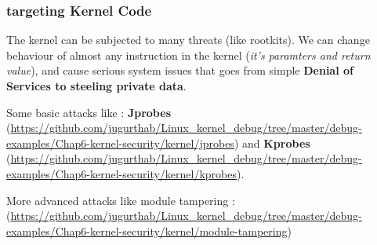 \begin{center}
\end{center}
\subsubsection{targeting Kernel Code}
The kernel can be subjected to many threats (like rootkits).
We can change behaviour of almost any instruction in the kernel (\textit{it's paramters and return value}), and cause
serious system issues that goes from simple \textbf{Denial of Services to steeling private data}.

Some basic attacks like : \textbf{Jprobes} ({\color{blue}\url{https://github.com/jugurthab/Linux_kernel_debug/tree/master/debug-examples/Chap6-kernel-security/kernel/jprobes}}) and \textbf{Kprobes} ({\color{blue}\url{https://github.com/jugurthab/Linux\_kernel\_debug/tree/master/debug-examples/Chap6-kernel-security/kernel/kprobes}}).


More advanced attacks like module tampering : ({\color{blue}\url{https://github.com/jugurthab/Linux_kernel_debug/tree/master/debug-examples/Chap6-kernel-security/kernel/module-tampering}})


